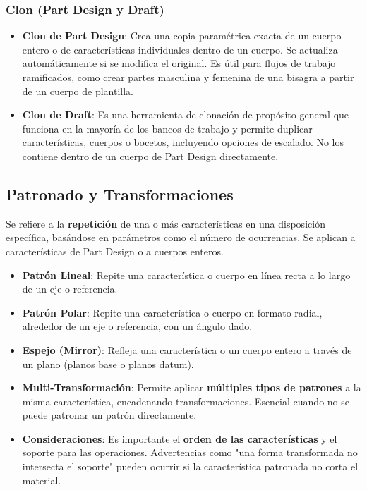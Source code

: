 \documentclass{article}
\begin{document}
\subsubsection*{Clon (Part Design y Draft)}
\begin{itemize}[noitemsep,topsep=0pt]
    \item \textbf{Clon de Part Design}: Crea una copia paramétrica exacta de un cuerpo entero o de características individuales dentro de un cuerpo. Se actualiza automáticamente si se modifica el original. Es útil para flujos de trabajo ramificados, como crear partes masculina y femenina de una bisagra a partir de un cuerpo de plantilla.
    \item \textbf{Clon de Draft}: Es una herramienta de clonación de propósito general que funciona en la mayoría de los bancos de trabajo y permite duplicar características, cuerpos o bocetos, incluyendo opciones de escalado. No los contiene dentro de un cuerpo de Part Design directamente.
\end{itemize}

\subsection*{Patronado y Transformaciones}
Se refiere a la \textbf{repetición} de una o más características en una disposición específica, basándose en parámetros como el número de ocurrencias. Se aplican a características de Part Design o a cuerpos enteros.
\begin{itemize}[noitemsep,topsep=0pt]
    \item \textbf{Patrón Lineal}: Repite una característica o cuerpo en línea recta a lo largo de un eje o referencia.
    \item \textbf{Patrón Polar}: Repite una característica o cuerpo en formato radial, alrededor de un eje o referencia, con un ángulo dado.
    \item \textbf{Espejo (Mirror)}: Refleja una característica o un cuerpo entero a través de un plano (planos base o planos datum).
    \item \textbf{Multi-Transformación}: Permite aplicar \textbf{múltiples tipos de patrones} a la misma característica, encadenando transformaciones. Esencial cuando no se puede patronar un patrón directamente.
    \item \textbf{Consideraciones}: Es importante el \textbf{orden de las características} y el soporte para las operaciones. Advertencias como "una forma transformada no intersecta el soporte" pueden ocurrir si la característica patronada no corta el material.
\end{itemize}
\end{document}
